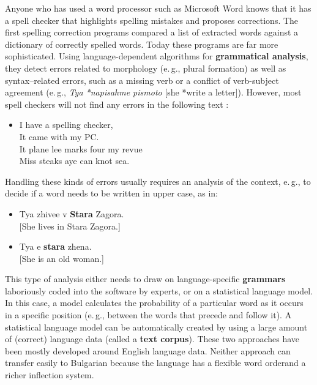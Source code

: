 \begin{multicols}{2}
  Anyone who has used a word processor such as Microsoft Word knows that it has a spell checker that highlights spelling mistakes and proposes corrections. The first spelling correction programs compared a list of extracted words against a dictionary of correctly spelled words. Today these programs are far more sophisticated. Using language-dependent algorithms for \textbf{grammatical analysis}, they detect errors related to morphology (e.\,g., plural formation) as well as syntax–related errors, such as a missing verb or a conflict of verb-subject agreement  (e.\,g., \textit{Tya *napisahme pismoto} [she *write a letter]). However, most spell checkers will not find any errors in the following text \cite{zar1}:

  \begin{itemize}
  \item[] I have a spelling checker,\\
    It came with my PC.\\
    It plane lee marks four my revue\\
    Miss steaks aye can knot sea.
  \end{itemize}

  Handling these kinds of errors usually requires an analysis of the context, e.\,g., to decide if a word needs to be written in upper case, as in:

  \begin{itemize}
  \item Tya zhivee v \textbf{Stara} Zagora.\\ {[}She lives in Stara Zagora.{]} 
  \item Tya e \textbf{stara} zhena.\\ {[}She is an old woman.{]}
  \end{itemize}

  This type of analysis either needs to draw on language-specific \textbf{grammars} laboriously coded into the software by experts, or on a statistical language model. In this case, a model calculates the probability of a particular word as it occurs in a specific position (e.\,g., between the words that precede and follow it). A statistical language model can be automatically created by using a large amount of (correct) language data (called a \textbf{text corpus}). These two approaches have been mostly developed around English language data. Neither approach can transfer easily to Bulgarian because the language has a flexible word orderand a richer inflection system. 


\end{multicols}
